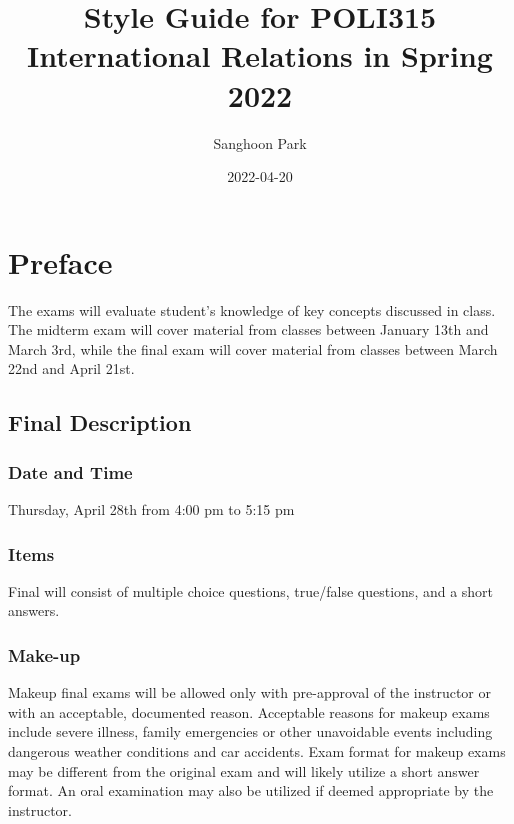 \documentclass[
]{book}
\title{Style Guide for POLI315 International Relations in Spring 2022}
\author{Sanghoon Park}
\date{2022-04-20}
\begin{document}
\maketitle

{
\setcounter{tocdepth}{1}
\tableofcontents
}
\hypertarget{preface}{%
\chapter*{Preface}\label{preface}}

The exams will evaluate student's knowledge of key concepts discussed in class. The midterm exam will cover material from classes between January 13th and March 3rd, while the final exam will cover material from classes between March 22nd and April 21st.

\hypertarget{final-description}{%
\section*{Final Description}\label{final-description}}

\hypertarget{date-and-time}{%
\subsection*{Date and Time}\label{date-and-time}}

Thursday, April 28th from 4:00 pm to 5:15 pm

\hypertarget{items}{%
\subsection*{Items}\label{items}}

Final will consist of multiple choice questions, true/false questions, and a short answers.

\hypertarget{make-up}{%
\subsection*{Make-up}\label{make-up}}

Makeup final exams will be allowed only with pre-approval of the instructor or with an acceptable, documented reason. Acceptable reasons for makeup exams include severe illness, family emergencies or other unavoidable events including dangerous weather conditions and car accidents. Exam format for makeup exams may be different from the original exam and will likely utilize a short answer format. An oral examination may also be utilized if deemed appropriate by the instructor.
\end{document}
